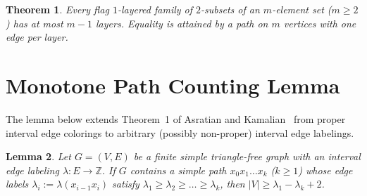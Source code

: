 \documentclass[11pt]{article}
\newtheorem{theorem}{Theorem}[section]
\newtheorem{lemma}[theorem]{Lemma}
\begin{document}
\begin{theorem}\label{thm:main}
Every flag $1$-layered family of $2$-subsets of an $m$-element set ($m \ge 2$) has at most $m - 1$ layers. Equality is attained by a path on $m$ vertices with one edge per layer.
\end{theorem}

\section{Monotone Path Counting Lemma}

The lemma below extends Theorem~1 of Asratian and Kamalian~\cite{AK1987} from proper interval edge colorings to arbitrary (possibly non-proper) interval edge labelings.

\begin{lemma}\label{lem:ak}
Let $G = (V, E)$ be a finite simple triangle-free graph with an interval edge labeling $\lambda : E \to \mathbb{Z}$. If $G$ contains a simple path $x_0 x_1 \dots x_k$ ($k \ge 1$) whose edge labels $\lambda_i := \lambda(x_{i-1} x_i)$ satisfy $\lambda_1 \ge \lambda_2 \ge \dots \ge \lambda_k$, then $|V| \ge \lambda_1 - \lambda_k + 2$.
\end{lemma}
\end{document}
